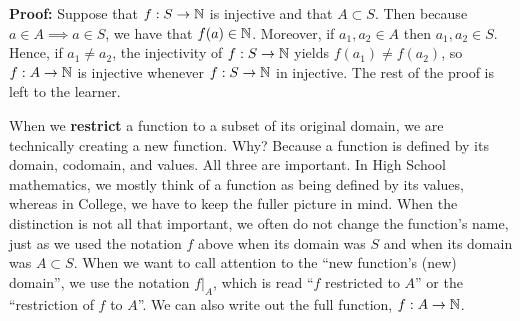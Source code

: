 \textbf{Proof:} Suppose that $f:S \to \mathbb N$ is injective and that $A \subset S$. Then because $a \in A \implies a \in S$, we have that $f(a) \in \mathbb N$. Moreover, if $a_1, a_2 \in A$ then $a_1, a_2 \in S$. Hence, if $a_1 \neq a_2$, the injectivity of $f:S \to \mathbb N$ yields $f(a_1) \neq f(a_2)$, so $f:A \to \mathbb N$ is injective whenever $f:S \to \mathbb N$ in injective. The rest of the proof is left to the learner.
\Qed

\begin{rem} When we \textbf{restrict} a function to a subset of its original domain, we are technically creating a new function. Why? Because a function is defined by its domain, codomain, and values. All three are important. In High School mathematics, we mostly think of a function as being defined by its values, whereas in College, we have to keep the fuller picture in mind. When the distinction is not all that important, we often do not change the function's name, just as we used the notation $f$ above when its domain was $S$ and when its domain was $A\subset S$. When we want to call attention to the ``new function's (new) domain'', we use the notation $\left.f\right|_A$, which is read ``$f$ restricted to $A$'' or the ``restriction of $f$ to $A$''. We can also write out the full function, $f:A \to \mathbb N$.    
\end{rem}

